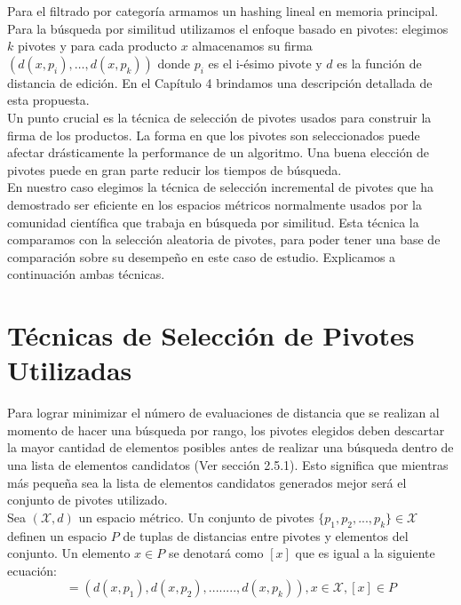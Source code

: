 Para el filtrado por categor\'ia armamos un hashing lineal en memoria principal. Para la búsqueda por similitud utilizamos el enfoque basado en pivotes: elegimos $k$ pivotes y para cada producto $x$ almacenamos su firma $(d(x,p_i), \ldots, d(x,p_k))$ donde $p_i$ es el i-\'esimo pivote y $d$ es la funci\'on de distancia de edici\'on. En el Cap\'itulo 4 brindamos una descripci\'on detallada de esta propuesta.\\
 
Un punto crucial es la t\'ecnica de selecci\'on de pivotes usados para construir la firma de los productos. La forma en que los pivotes son seleccionados puede afectar dr\'asticamente la performance de un algoritmo. Una buena elecci\'on de pivotes puede en gran parte reducir los tiempos de b\'usqueda.\\
 
En nuestro caso elegimos la t\'ecnica de selecci\'on incremental de pivotes \cite{BNCsccc01} que ha demostrado ser eficiente en los espacios m\'etricos  normalmente usados por la comunidad cient\'ifica que trabaja en b\'usqueda por similitud. Esta t\'ecnica la comparamos con la selecci\'on aleatoria de pivotes, para poder tener una base de comparaci\'on sobre su desempeño en este caso de estudio. Explicamos a continuaci\'on ambas t\'ecnicas.\\
 
\section{T\'ecnicas de Selecci\'on de Pivotes Utilizadas}

Para lograr minimizar el n\'umero de evaluaciones de distancia que se realizan al momento de hacer una b\'usqueda por rango, los pivotes elegidos deben descartar la mayor cantidad de elementos posibles antes de realizar una b\'usqueda dentro de una lista de elementos candidatos (Ver secci\'on 2.5.1). Esto significa que mientras más peque\~na sea la lista de elementos candidatos generados mejor ser\'a el conjunto de pivotes utilizado. \\

Sea $(\mathcal{X},d)$ un espacio m\'etrico. Un conjunto de pivotes $\{p_1,p_2,...,p_k\} \in \mathcal{X}$ definen un espacio $P$ de tuplas de distancias entre pivotes y elementos del conjunto. Un elemento $x \in P$ se denotar\'a como $[x]$ que es igual a la siguiente ecuaci\'on:\\

\begin{equation}
[x] = (d(x,p_1),d(x,p_2),........,d(x,p_k)), x \in \mathcal{X}, [x] \in P
\label{eq-mapeo}
\end{equation}
\\

